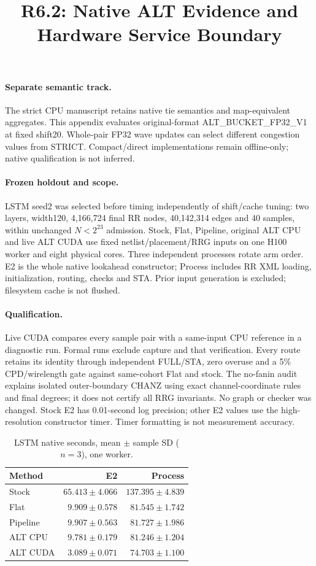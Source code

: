 \documentclass[10pt]{article}
\title{R6.2: Native ALT Evidence and Hardware Service Boundary}
\author{}\date{}
\begin{document}
\maketitle
\paragraph{Separate semantic track.} The strict CPU manuscript retains native tie semantics and map-equivalent aggregates. This appendix evaluates original-format ALT\_BUCKET\_FP32\_V1 at fixed shift20. Whole-pair FP32 wave updates can select different congestion values from STRICT. Compact/direct implementations remain offline-only; native qualification is not inferred.

\paragraph{Frozen holdout and scope.} LSTM seed2 was selected before timing independently of shift/cache tuning: two layers, width120, 4,166,724 final RR nodes, 40,142,314 edges and 40 samples, within unchanged $N<2^{23}$ admission. Stock, Flat, Pipeline, original ALT CPU and live ALT CUDA use fixed netlist/placement/RRG inputs on one H100 worker and eight physical cores. Three independent processes rotate arm order. E2 is the whole native lookahead constructor; Process includes RR XML loading, initialization, routing, checks and STA. Prior input generation is excluded; filesystem cache is not flushed.

\paragraph{Qualification.} Live CUDA compares every sample pair with a same-input CPU reference in a diagnostic run. Formal runs exclude capture and that verification. Every route retains its identity through independent FULL/STA, zero overuse and a 5\% CPD/wirelength gate against same-cohort Flat and stock. The no-fanin audit explains isolated outer-boundary CHANZ using exact channel-coordinate rules and final degrees; it does not certify all RRG invariants. No graph or checker was changed. Stock E2 has 0.01-second log precision; other E2 values use the high-resolution constructor timer. Timer formatting is not measurement accuracy.

\begin{table}[h]\centering\small
\caption{LSTM native seconds, mean $\pm$ sample SD ($n=3$), one worker.}
\begin{tabular}{lrr}\toprule Method & E2 & Process\\\midrule
Stock & $65.413\pm4.066$ & $137.395\pm4.839$\\
Flat & $9.909\pm0.578$ & $81.545\pm1.742$\\
Pipeline & $9.907\pm0.563$ & $81.727\pm1.986$\\
ALT CPU & $9.781\pm0.179$ & $81.246\pm1.204$\\
ALT CUDA & $3.089\pm0.071$ & $74.703\pm1.100$\\
\bottomrule\end{tabular}\end{table}
\end{document}
